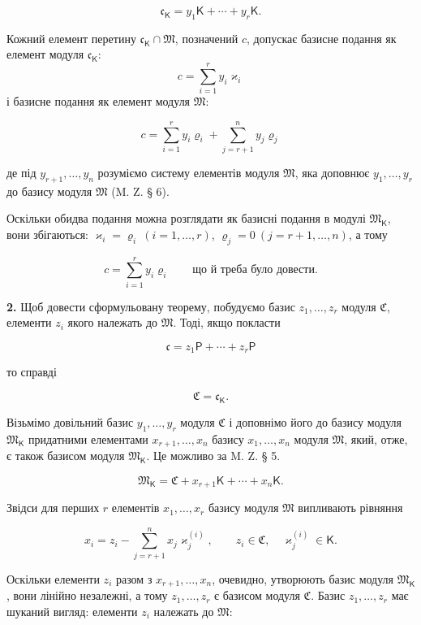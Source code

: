 \documentclass[11pt]{article}
\begin{document}
\[
\mathfrak c_{\mathsf K}=y_1\mathsf K+\cdots+y_r\mathsf K.
\]

Кожний елемент перетину \(\mathfrak c_{\mathsf K}\cap\mathfrak M\), позначений \(c\), допускає базисне подання як елемент модуля \(\mathfrak c_{\mathsf K}\):
\[
c=\sum_{i=1}^{r}y_i\varkappa_i
\]
і базисне подання як елемент модуля \(\mathfrak M\):

\[
c=\sum_{i=1}^{r}y_i\varrho_i+\sum_{j=r+1}^{n}y_j\varrho_j
\]

де під \(y_{r+1},\ldots,y_n\) розуміємо систему елементів модуля \(\mathfrak M\), яка доповнює \(y_1,\ldots,y_r\) до базису модуля \(\mathfrak M\) (M. Z. § 6).

Оскільки обидва подання можна розглядати як базисні подання в модулі \(\mathfrak M_{\mathsf K}\), вони збігаються: \(\varkappa_i=\varrho_i\ (i=1,\ldots,r)\), \(\varrho_j=0\ (j=r+1,\ldots,n)\), а тому

\[
c=\sum_{i=1}^{r}y_i\varrho_i
\qquad\text{що й треба було довести.}
\]

\textbf{2.} Щоб довести сформульовану теорему, побудуємо базис \(z_1,\ldots,z_r\) модуля \(\mathfrak C\), елементи \(z_i\) якого належать до \(\mathfrak M\). Тоді, якщо покласти

\[
\mathfrak c=z_1\mathsf P+\cdots+z_r\mathsf P
\]

то справді

\[
\mathfrak C=\mathfrak c_{\mathsf K}.
\]

Візьмімо довільний базис \(y_1,\ldots,y_r\) модуля \(\mathfrak C\) і доповнімо його до базису модуля \(\mathfrak M_{\mathsf K}\) придатними елементами \(x_{r+1},\ldots,x_n\) базису \(x_1,\ldots,x_n\) модуля \(\mathfrak M\), який, отже, є також базисом модуля \(\mathfrak M_{\mathsf K}\). Це можливо за M. Z. § 5.

\[
\mathfrak M_{\mathsf K}=\mathfrak C+x_{r+1}\mathsf K+\cdots+x_n\mathsf K.
\]

Звідси для перших \(r\) елементів \(x_1,\ldots,x_r\) базису модуля \(\mathfrak M\) випливають рівняння

\[
x_i=z_i-\sum_{j=r+1}^{n}x_j\varkappa_j^{(i)},\qquad
z_i\in\mathfrak C,\quad \varkappa_j^{(i)}\in\mathsf K.
\]

Оскільки елементи \(z_i\) разом з \(x_{r+1},\ldots,x_n\), очевидно, утворюють базис модуля \(\mathfrak M_{\mathsf K}\), вони лінійно незалежні, а тому \(z_1,\ldots,z_r\) є базисом модуля \(\mathfrak C\). Базис \(z_1,\ldots,z_r\) має шуканий вигляд: елементи \(z_i\) належать до \(\mathfrak M\):
\end{document}
